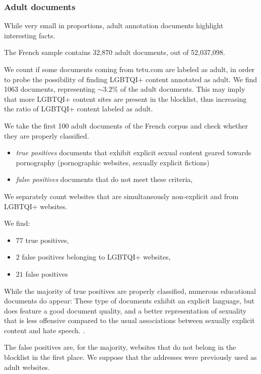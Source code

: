 \subsubsection{Adult documents}

While very small in proportions, adult annotation documents highlight interesting facts.

The French sample contains 32,870 adult documents, out of 52,037,098.

We count if some documents coming from tetu.com are labeled as adult, in order to probe the possibility of finding LGBTQI+ content annotated as adult. We find 1063 documents, representing $\sim 3.2\%$ of the adult documents. This may imply that more LGBTQI+ content sites are present in the blocklist, thus increasing the ratio of LGBTQI+ content labeled as adult.

We take the first 100 adult documents of the French corpus and check whether they are properly classified.
\begin{itemize}
    \item \emph{true positives} documents that exhibit explicit sexual content geared towards pornography (pornographic websites, sexually explicit fictions)
    \item \emph{false positives} documents that do not meet these criteria,
\end{itemize}

We separately count websites that are simultaneously non-explicit and from LGBTQI+ websites.

We find:
\begin{itemize}
    \item $77$ true positives,
    \item $2$ false positives belonging to LGBTQI+ websites,
    \item $21$ false positives
\end{itemize}

While the majority of true positives are properly classified, numerous educational documents do appear: These type of documents exhibit an explicit language, but does feature a good document quality, and a better representation of sexuality that is less offensive compared to the usual associations between sexually explicit content and hate speech.  \cite{luccioni-viviano-2021-whats}.

The false positives are, for the majority, websites that do not belong in the blocklist in the first place. We suppose that the addresses were previously used as adult websites.

